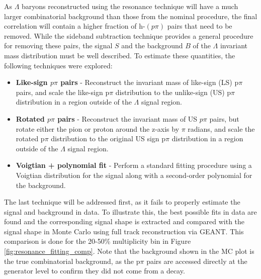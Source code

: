As $\Lambda$ baryons reconstructed using the resonance technique will have a much larger combinatorial background than those from the nominal procedure, the final correlation will contain a higher fraction of h-$(p\pi)$ pairs that need to be removed. While the sideband subtraction technique provides a general procedure for removing these pairs, the signal $S$ and the background $B$ of the $\Lambda$ invariant mass distribution must be well described. To estimate these quantities, the following techniques were explored:
%
 \begin{itemize}
	\item \textbf{Like-sign $p\pi$ pairs} - Reconstruct the invariant mass of like-sign (LS) p$\pi$ pairs, and scale the like-sign p$\pi$ distribution to the unlike-sign (US) p$\pi$ distribution in a region outside of the $\Lambda$ signal region.
	\item \textbf{Rotated $p\pi$ pairs} - Reconstruct the invariant mass of US $p\pi$ pairs, but rotate either the pion or proton around the z-axis by $\pi$ radians, and scale the rotated p$\pi$ distribution to the original US sign p$\pi$ distribution in a region outside of the $\Lambda$ signal region.
	\item \textbf{Voigtian + polynomial fit} - Perform a standard fitting procedure using a Voigtian distribution for the signal along with a second-order polynomial for the background.
 \end{itemize}
%
The last technique will be addressed first, as it fails to properly estimate the signal and background in data. To illustrate this, the best possible fits in data are found and the corresponding signal shape is extracted and compared with the signal shape in Monte Carlo using full track reconstruction via GEANT. This comparison is done for the 20-50\% multiplicity bin in Figure \ref{fig:resonance_fitting_comp}. Note that the background shown in the MC plot is the true combinatorial background, as the  p$\pi$ pairs are accessed directly at the generator level to confirm they did not come from a \lmb decay. 

